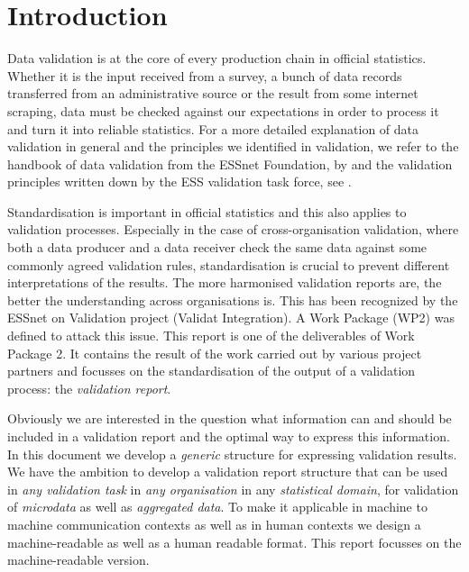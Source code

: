 \section{Introduction}
\label{sect:introduction}

Data validation is at the core of every production chain in official
statistics.  Whether it is the input received from a survey, a bunch of data
records transferred from an administrative source or the result from some
internet scraping, data must be checked against our expectations in order to
process it and turn it into reliable statistics.  For a more detailed
explanation of data validation in general and the principles we identified in
validation, we refer to the handbook of data validation from the ESSnet
Foundation, by \citet{zio2015methodology} and the validation principles written
down by the ESS validation task force, see \citet[Chapter 4]{ess2017}.

Standardisation is important in official statistics and this also applies to
validation processes.  Especially in the case of cross-organisation validation,
where both a data producer and a data receiver check the same data against some
commonly agreed validation rules, standardisation is crucial to prevent
different interpretations of the results.  The more harmonised validation
reports are, the better the understanding across organisations is.  This has
been recognized by the ESSnet on Validation project (Validat Integration).  A
Work Package (WP2) was defined to attack this issue.  This report is one of the
deliverables of Work Package 2.  It contains the result of the work carried out
by various project partners and focusses on the standardisation of the output
of a validation process: the \emph{validation report}.

Obviously we are interested in the question what information can and should be
included in a validation report and the optimal way to express this
information.  In this document we develop a \emph{generic} structure for
expressing validation results.  We have the ambition to develop a validation
report structure that can be used in \emph{any validation task} in \emph{any
organisation} in any \emph{statistical domain}, for validation of
\emph{microdata} as well as \emph{aggregated data}.  To make it applicable in
machine to machine communication contexts as well as in human contexts we
design a machine-readable as well as a human readable format.  This report
focusses on the machine-readable version.

